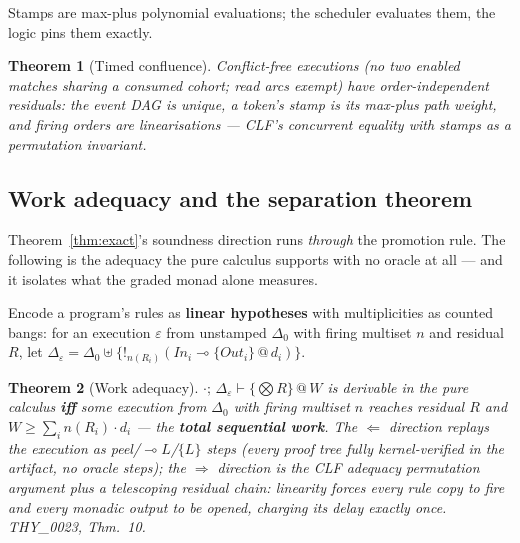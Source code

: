 \documentclass[11pt]{article}
\makeatletter
\newcommand{\lax}[2]{\{#1\}\mathbin{@}#2}       %
\newcommand{\gbang}[1]{{!}_{#1}}                 %
\newcommand{\loli}{\multimap}                    %
\newtheorem{theorem}{Theorem}[section]
\theoremstyle{definition}
\theoremstyle{remark}
\makeatother
\begin{document}
\noindent Stamps are max-plus polynomial evaluations; the scheduler evaluates
them, the logic pins them exactly.

\begin{theorem}[Timed confluence]
\label{thm:confluence}
Conflict-free executions (no two enabled matches sharing a consumed cohort; read
arcs exempt) have order-independent residuals: the event DAG is unique, a
token's stamp is its max-plus path weight, and firing orders are
linearisations --- CLF's concurrent equality with stamps as a permutation
invariant.
\end{theorem}

\subsection{Work adequacy and the separation theorem}

Theorem~\ref{thm:exact}'s soundness direction runs \emph{through} the
promotion rule.  The following is the adequacy the pure calculus supports with
no oracle at all --- and it isolates what the graded monad alone measures.

Encode a program's rules as \textbf{linear hypotheses} with multiplicities as
counted bangs: for an execution $\varepsilon$ from unstamped $\Delta_0$ with
firing multiset $n$ and residual $R$, let
$\Delta_\varepsilon = \Delta_0 \uplus
\{\gbang{n(R_i)}(In_i \loli \lax{Out_i}{d_i})\}$.

\begin{theorem}[Work adequacy]
\label{thm:work}
$\cdot;\, \Delta_\varepsilon \vdash \lax{\bigotimes R}{W}$ is derivable in the
pure calculus \textbf{iff} some execution from $\Delta_0$ with firing multiset
$n$ reaches residual $R$ and $W \geq \sum_i n(R_i)\cdot d_i$ --- the
\textbf{total sequential work}.  The $\Leftarrow$ direction replays the
execution as peel/$\loli L$/$\mathit{\{L\}}$ steps (every proof tree fully
kernel-verified in the artifact, no oracle steps); the $\Rightarrow$ direction
is the CLF adequacy permutation argument plus a telescoping residual chain:
linearity forces every rule copy to fire and every monadic output to be opened,
charging its delay exactly once.  THY\_0023, Thm.~10.
\end{theorem}
\end{document}
